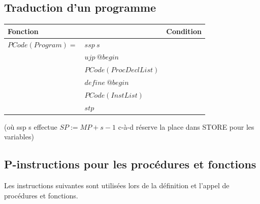 \documentclass[french,11pt,twoside]{article}
\begin{document}
\subsection{Traduction d'un programme}

\begin{tabular}{| l l | l |}
\hline
Fonction                                 &                                                                          & Condition \\
\hline
$PCode(Program) = $             & $ssp\ s$                                                          & \\
                                              & $ujp\ @begin$                                                 & \\
                                              & $PCode(ProcDeclList) $                                     & \\
                                              & $define\ @begin$                                             & \\
                                              & $PCode(InstList)$                                              & \\ 
                                              & $stp$                                                                 & \\ 
\hline
\end{tabular}

(où ssp s effectue $SP:=MP+s-1$ c-à-d réserve la place dans STORE pour les variables)


\subsection{P-instructions pour les procédures et fonctions}

Les instructions suivantes sont utilisées lors de la définition et l'appel de procédures et fonctions.
\end{document}
